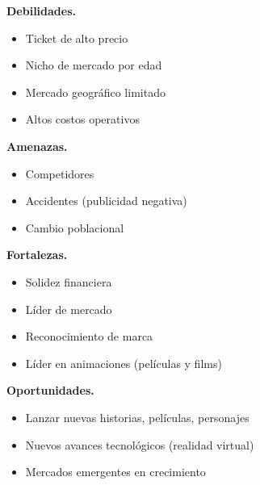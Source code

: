 \documentclass[a4paper]{article}
\begin{document}
\begin{figure}[ht] 
    \label{DAFO} 
    \begin{minipage}[b]{0.5\linewidth}
        \centering

          \textbf{Debilidades.}
          \begin{itemize}
              \item Ticket de alto precio
              \item Nicho de mercado por edad
              \item Mercado geográfico limitado
              \item Altos costos operativos
          \end{itemize}

          \vspace{4ex}
        \end{minipage}%
        \begin{minipage}[b]{0.5\linewidth}
          \centering
          
          \textbf{Amenazas.}
\begin{itemize}
    \item Competidores
    \item Accidentes (publicidad negativa)
    \item Cambio poblacional
\end{itemize}

          \vspace{4ex}
        \end{minipage} 
        \begin{minipage}[b]{0.5\linewidth}
          \centering
          
          \textbf{Fortalezas.}
\begin{itemize}
    \item Solidez financiera
    \item Líder de mercado
    \item Reconocimiento de marca
    \item Líder en animaciones (películas y films)
\end{itemize}

          \vspace{4ex}
        \end{minipage}%
        \begin{minipage}[b]{0.5\linewidth}
          \centering
          
          \textbf{Oportunidades.}
\begin{itemize}
    \item Lanzar nuevas historias, películas, personajes
    \item Nuevos avances tecnológicos (realidad virtual)
    \item Mercados emergentes en crecimiento
\end{itemize}

          \vspace{4ex}
    \end{minipage} 
\end{figure}
\end{document}

